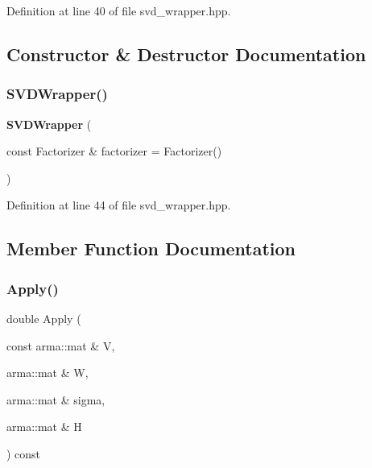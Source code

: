 Definition at line 40 of file svd\+\_\+wrapper.\+hpp.



\subsection{Constructor \& Destructor Documentation}
\mbox{\label{classmlpack_1_1cf_1_1SVDWrapper_a062f6d1d0cbae52c35ee6cdc7c0e12e2}} 
\subsubsection{S\+V\+D\+Wrapper()}
{\footnotesize\ttfamily \textbf{ S\+V\+D\+Wrapper} (\begin{DoxyParamCaption}\item[{const Factorizer \&}]{factorizer = {\ttfamily Factorizer()} }\end{DoxyParamCaption})\hspace{0.3cm}{\ttfamily [inline]}}



Definition at line 44 of file svd\+\_\+wrapper.\+hpp.



\subsection{Member Function Documentation}
\mbox{\label{classmlpack_1_1cf_1_1SVDWrapper_a9a4d773f77543202c714b0bd8871cd36}} 
\subsubsection{Apply()\hspace{0.1cm}{\footnotesize\ttfamily [1/2]}}
{\footnotesize\ttfamily double Apply (\begin{DoxyParamCaption}\item[{const arma\+::mat \&}]{V,  }\item[{arma\+::mat \&}]{W,  }\item[{arma\+::mat \&}]{sigma,  }\item[{arma\+::mat \&}]{H }\end{DoxyParamCaption}) const}



